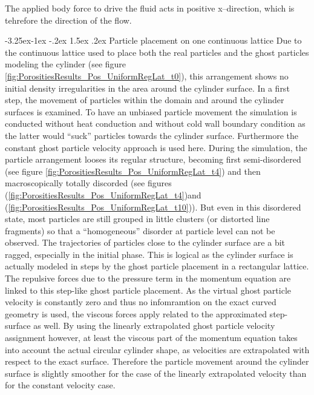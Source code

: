 \documentclass{report}
\makeatletter
\renewcommand\paragraph{\@startsection{paragraph}{4}{\z@}%
  {-3.25ex\@plus -1ex \@minus -.2ex}%
  {1.5ex \@plus .2ex}%
  {\normalfont\normalsize\bfseries}}
\makeatother
\begin{document}
The applied body force to drive the fluid acts in positive x--direction, which is tehrefore the direction of the flow. 

\paragraph{Particle placement on one continuous lattice}
Due to the continuous lattice used to place both the real particles and the ghost particles modeling the cylinder (see figure \ref{fig:PorositiesResults_Pos_UniformRegLat_t0}), this arrangement shows no initial density irregularities in the area around the cylinder surface. 
In a first step, the movement of particles within the domain and around the cylinder surfaces is examined. To have an unbiased particle movement the simulation is conducted without heat conduction and without cold wall boundary condition as the latter would ``suck'' particles towards the cylinder surface. Furthermore the constant ghost particle velocity approach is used here. 
During the simulation, the particle arrangement looses its regular structure, becoming first semi-disordered (see figure \ref{fig:PorositiesResults_Pos_UniformRegLat_t4}) and then macroscopically totally discorded (see figures (\ref{fig:PorositiesResults_Pos_UniformRegLat_t4})and  (\ref{fig:PorositiesResults_Pos_UniformRegLat_t10})). But even in this disordered state, most particles are still grouped in little clusters (or distorted line fragments) so that a ``homogeneous'' disorder at particle level can not be observed.
The trajectories of particles close to the cylinder surface are a bit ragged, especially in the initial phase. This is logical as the cylinder surface is actually modeled in steps by the ghost particle placement in a rectangular lattice. The repulsive forces due to the pressure term in the momentum equation are linked to this step-like ghost particle placement. As the virtual ghost particle velocity is constantly zero and thus no infomramtion on the exact curved geometry is used, the viscous forces apply related to the approximated step-surface as well.
By using the linearly extrapolated ghost particle velocity assignment however, at least the viscous part of the momentum equation takes into account the actual circular cylinder shape, as velocities are extrapolated with respect to the exact surface. Therefore the particle movement around the cylinder surface is slightly smoother for the case of the linearly extrapolated velocity than for the constant velocity case. 
\end{document}
